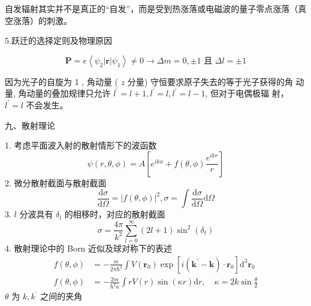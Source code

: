 \documentclass[../../note.tex]{subfiles}
\begin{document}
自发辐射其实并不是真正的“自发”，而是受到热涨落或电磁波的量子零点涨落（真空涨落）的刺激。

5.跃迁的选择定则及物理原因

$$\boldsymbol{P}=e\left\langle\psi_2|\boldsymbol{r}| \psi_1\right\rangle \neq 0 \rightarrow \Delta m=0, \pm 1 \text { 且 } \Delta l= \pm 1$$

因为光子的自旋为 1 , 角动量 ( $z$ 分量) 守恒要求原子失去的等于光子获得的角 动量, 角动量的叠加规律只允许 $l^{\prime}=l+1, l^{\prime}=l, l^{\prime}=l-1$, 但对于电偶极辐 射， $l^{\prime}=l$ 不会发生。

九、散射理论

1. 考虑平面波入射的散射情形下的波函数
$$
\psi(r, \theta, \phi)=A\left[e^{i k x}+f(\theta, \phi) \frac{e^{i k r}}{r}\right]
$$
2. 微分散射截面与散射截面
$$
\frac{\mathrm{d} \sigma}{\mathrm{d} \Omega}=|f(\theta, \phi)|^2, \sigma=\int \frac{\mathrm{d} \sigma}{\mathrm{d} \Omega} \mathrm{d} \Omega
$$
3. $l$ 分波具有 $\delta_l$ 的相移时，对应的散射截面
$$
\sigma=\frac{4 \pi}{k^2} \sum_{l=0}^{\infty}(2 l+1) \sin ^2\left(\delta_t\right)
$$
4. 散射理论中的 Born 近似及球对称下的表述
$$
\begin{aligned}
f(\theta, \phi) & =-\frac{m}{2 \pi \hbar^2} \int V\left(\boldsymbol{r}_0\right) \exp \left[i\left(\boldsymbol{k}^{\prime}-\boldsymbol{k}\right) \cdot \boldsymbol{r}_0\right] \mathrm{d}^3 \boldsymbol{r}_0 \\
f(\theta, \phi) & =-\frac{2 m}{\hbar^2 \kappa} \int r V(r) \sin (\kappa r) \mathrm{d} r, \quad \kappa=2 k \sin \frac{\theta}{2}
\end{aligned}
$$
$\theta$ 为 $k, k^{\prime}$ 之间的夹角
\end{document}
